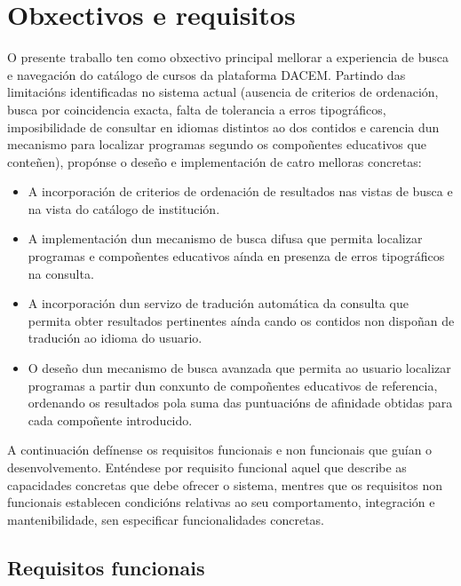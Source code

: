\documentclass[%
    a4paper,               %
    twoside,               %
    10pt,                  %
]{article}                 %
\begin{document}
\section{Obxectivos e requisitos}
\label{sec:obxectivos}
O presente traballo ten como obxectivo principal mellorar a experiencia de busca e navegación do catálogo de cursos da plataforma DACEM. Partindo das limitacións identificadas no sistema actual (ausencia de criterios de ordenación, busca por coincidencia exacta, falta de tolerancia a erros tipográficos, imposibilidade de consultar en idiomas distintos ao dos contidos e carencia dun mecanismo para localizar programas segundo os compoñentes educativos que conteñen), propónse o deseño e implementación de catro melloras concretas:
\begin{itemize}
    \item A incorporación de criterios de ordenación de resultados nas vistas de busca e na vista do catálogo de institución.
    \item A implementación dun mecanismo de busca difusa que permita localizar programas e compoñentes educativos aínda en presenza de erros tipográficos na consulta.
    \item A incorporación dun servizo de tradución automática da consulta que permita obter resultados pertinentes aínda cando os contidos non dispoñan de tradución ao idioma do usuario.
    \item O deseño dun mecanismo de busca avanzada que permita ao usuario localizar programas a partir dun conxunto de compoñentes educativos de referencia, ordenando os resultados pola suma das puntuacións de afinidade obtidas para cada compoñente introducido.
\end{itemize}

A continuación defínense os requisitos funcionais e non funcionais que guían o desenvolvemento. Enténdese por requisito funcional aquel que describe as capacidades concretas que debe ofrecer o sistema, mentres que os requisitos non funcionais establecen condicións relativas ao seu comportamento, integración e mantenibilidade, sen especificar funcionalidades concretas.

\subsection{Requisitos funcionais}

\end{document}

